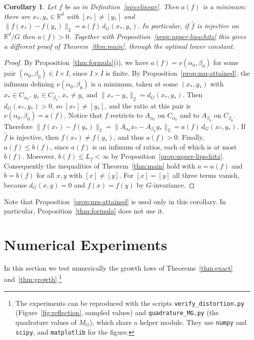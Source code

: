 \documentclass[11pt]{article}
\newcommand{\R}{\mathbb{R}}
\newtheorem{cor}[theor]{Corollary}
\theoremstyle{definition}
\begin{document}
\begin{cor}\label{cor:main-from-formula}
	Let $f$ be as in Definition~\ref{piecelinear}. Then $a(f)$ is a minimum: there are
	$x_{*},y_{*}\in\R^{d}$ with $[x_{*}]\neq[y_{*}]$ and
	$\|f(x_{*})-f(y_{*})\|_2=a(f)\,d_{G}(x_{*},y_{*})$. In particular, if $\widehat f$ is
	injective on $\R^{d}/G$ then $a(f)>0$. Together with
	Proposition~\ref{prop:upper-lipschitz} this gives a different proof of
	Theorem~\ref{thm:main}, through the optimal lower constant.
\end{cor}

\begin{proof}
	By Proposition~\ref{thm:formula}(i), we have $a(f)=\nu(\alpha_{0},\beta_{0})$ for some pair
	$(\alpha_{0},\beta_{0})\in I\times I$, since $I\times I$ is finite. By
	Proposition~\ref{prop:mu-attained}, the infimum defining $\nu(\alpha_{0},\beta_{0})$ is a
	minimum, taken at some $(x_{*},y_{*})$ with $x_{*}\in C_{\alpha_{0}}$, $y_{*}\in C_{\beta_{0}}$,
	$x_{*}\neq y_{*}$ and $\|x_{*}-y_{*}\|_2=d_{G}(x_{*},y_{*})$. Then $d_{G}(x_{*},y_{*})>0$, so
	$[x_{*}]\neq[y_{*}]$, and the ratio at this pair is $\nu(\alpha_{0},\beta_{0})=a(f)$. Notice that
	$f$ restricts to $A_{\alpha_{0}}$ on $C_{\alpha_{0}}$ and to $A_{\beta_{0}}$ on $C_{\beta_{0}}$.
	Therefore
	$\|f(x_{*})-f(y_{*})\|_2=\|A_{\alpha_{0}}x_{*}-A_{\beta_{0}}y_{*}\|_2=a(f)\,d_{G}(x_{*},y_{*})$.
	If $\widehat f$ is injective, then $f(x_{*})\neq f(y_{*})$, and thus $a(f)>0$. Finally,
	$a(f)\leq b(f)$, since $a(f)$ is an infimum of ratios, each of which is at most $b(f)$.
	Moreover, $b(f)\leq L_f<\infty$ by Proposition~\ref{prop:upper-lipschitz}. Consequently the
	inequalities of Theorem~\ref{thm:main} hold with $a=a(f)$ and $b=b(f)$ for all $x,y$ with
	$[x]\neq[y]$. For $[x]=[y]$ all three terms vanish, because $d_{G}(x,y)=0$ and $f(x)=f(y)$ by
	$G$-invariance.
\end{proof}

Note that Proposition~\ref{prop:mu-attained} is used only in this corollary. In particular,
Proposition~\ref{thm:formula} does not use it.


\section{Numerical Experiments}\label{sec:experiments}

In this section we test numerically the growth laws of Theorems~\ref{thm:exact} and~\ref{thm:growth}.\footnote{The experiments can be reproduced with the scripts \texttt{verify\_distortion.py} (Figure~\ref{fig:reflection}, sampled values) and \texttt{quadrature\_MG.py} (the quadrature values of $M_G$), which share a helper module. They use \texttt{numpy} and \texttt{scipy}, and \texttt{matplotlib} for the figure.}
\end{document}
